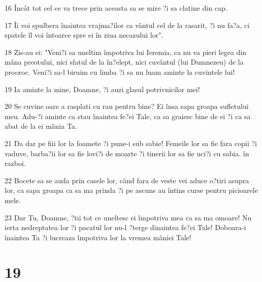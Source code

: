 \par 16 Încât tot cel ce va trece prin aceasta sa se mire ?i sa clatine din cap.
\par 17 Îi voi spulbera înaintea vrajma?ilor ca vântul cel de la rasarit, ?i nu fa?a, ci spatele îl voi întoarce spre ei în ziua necazului lor".
\par 18 Zis-au ei: "Veni?i sa uneltim împotriva lui Ieremia, ca nu va pieri legea din mâna preotului, nici sfatul de la în?elept, nici cuvântul (lui Dumnezeu) de la prooroc. Veni?i sa-l biruim cu limba ?i sa nu luam aminte la cuvintele lui!
\par 19 Ia aminte la mine, Doamne, ?i auzi glasul potrivnicilor mei!
\par 20 Se cuvine oare a rasplati cu rau pentru bine? Ei însa sapa groapa sufletului meu. Adu-?i aminte ca stau înaintea fe?ei Tale, ca sa graiesc bine de ei ?i ca sa abat de la ei mânia Ta.
\par 21 Da dar pe fiii lor la foamete ?i pune-i sub sabie! Femeile lor sa fie fara copii ?i vaduve, barba?ii lor sa fie lovi?i de moarte ?i tinerii lor sa fie uci?i cu sabia. în razboi.
\par 22 Bocete sa se auda prin casele lor, când fara de veste vei aduce o?tiri asupra lor, ca sapa groapa ca sa ma prinda ?i pe ascuns au întins curse pentru picioarele mele.
\par 23 Dar Tu, Doamne, ?tii tot ce uneltesc ei împotriva mea ca sa ma omoare! Nu ierta nedreptatea lor ?i pacatul lor nu-l ?terge dinaintea fe?ei Tale! Doboara-i înaintea Ta ?i lucreaza împotriva lor la vremea mâniei Tale!

\chapter{19}


